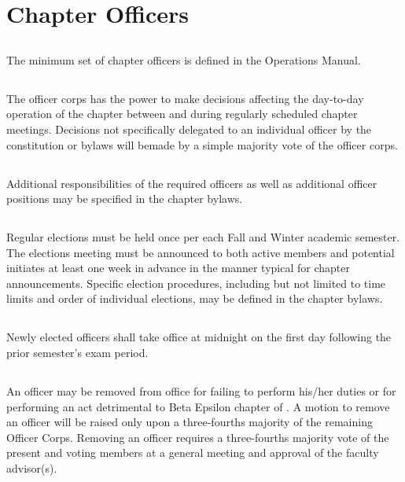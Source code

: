 \chapter{Chapter Officers}
\section{}
The minimum set of chapter officers is defined in the \hkn Operations Manual.

\section{}
The officer corps has the power to make decisions affecting the day-to-day operation of the chapter between and during regularly scheduled chapter meetings.
Decisions not specifically delegated to an individual officer by the constitution or bylaws will bemade by a simple majority vote of the officer corps.

\section{}
Additional responsibilities of the required officers as well as additional officer positions may be specified in the chapter bylaws.

\section{}
Regular elections must be held once per each Fall and Winter academic semester.
The elections meeting must be announced to both active members and potential initiates at least one week in advance in the manner typical for chapter announcements.
Specific election procedures, including but not limited to time limits and order of individual elections, may be defined in the chapter bylaws.

\section{}
Newly elected officers shall take office at midnight on the first day following the prior semester's exam period.

\section{}
An officer may be removed from office for failing to perform his/her duties or for performing an act detrimental to Beta Epsilon chapter of \hkn.
A motion to remove an officer will be raised only upon a three-fourths majority of the remaining Officer Corps.
Removing an officer requires a three-fourths majority vote of the present and voting members at a general meeting and approval of the faculty advisor(s).
